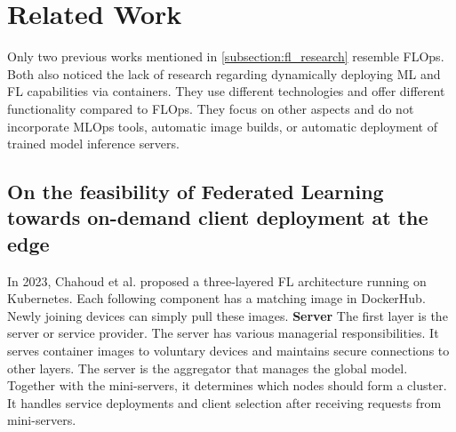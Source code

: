 \section{Related Work}

Only two previous works \cite{paper:fl_toward_on_demand_client_deployment_at_edge, paper:global_fl_platform_for_iot} mentioned in \ref{subsection:fl_research} resemble FLOps.
Both also noticed the lack of research regarding dynamically deploying ML and FL capabilities via containers.
They use different technologies and offer different functionality compared to FLOps.
They focus on other aspects and do not incorporate MLOps tools, automatic image builds, or automatic deployment of trained model inference servers.

\subsection{On the feasibility of Federated Learning towards on-demand client deployment at the edge}
In 2023, Chahoud et al. \cite{paper:fl_toward_on_demand_client_deployment_at_edge} proposed a three-layered FL architecture running on Kubernetes.
Each following component has a matching image in DockerHub.
Newly joining devices can simply pull these images.
\vspace{5mm}
\newline
\textbf{Server}\newline
The first layer is the server or service provider.
The server has various managerial responsibilities.
It serves container images to voluntary devices and maintains secure connections to other layers.
The server is the aggregator that manages the global model.
Together with the mini-servers, it determines which nodes should form a cluster.
It handles service deployments and client selection after receiving requests from mini-servers.

